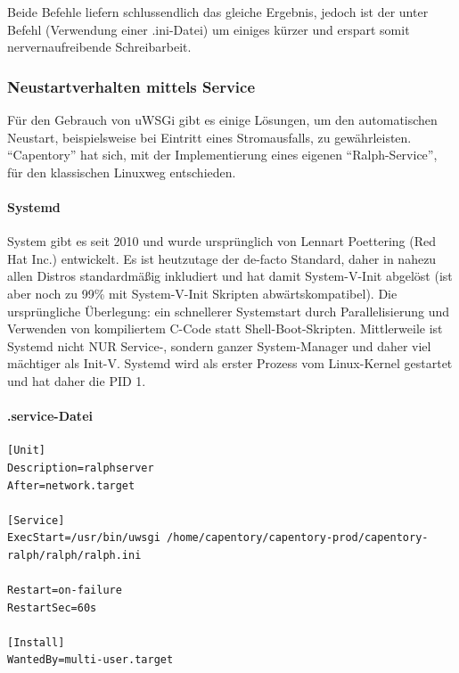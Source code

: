 Beide Befehle liefern schlussendlich das gleiche Ergebnis, jedoch ist
der unter Befehl (Verwendung einer .ini-Datei) um einiges kürzer und
erspart somit nervernaufreibende Schreibarbeit.

\hypertarget{neustartverhalten-mittels-service}{%
\subsubsection{Neustartverhalten mittels
Service}\label{neustartverhalten-mittels-service}}

Für den Gebrauch von uWSGi gibt es einige Lösungen, um den automatischen
Neustart, beispielsweise bei Eintritt eines Stromausfalls, zu
gewährleisten. ``Capentory'' hat sich, mit der Implementierung eines
eigenen ``Ralph-Service'', für den klassischen Linuxweg entschieden.

\hypertarget{systemd}{%
\paragraph{Systemd}\label{systemd}}

System gibt es seit 2010 und wurde ursprünglich von Lennart Poettering
(Red Hat Inc.) entwickelt. Es ist heutzutage der de-facto Standard,
daher in nahezu allen Distros standardmäßig inkludiert und hat damit
System-V-Init abgelöst (ist aber noch zu 99\% mit System-V-Init Skripten
abwärtskompatibel). Die ursprüngliche Überlegung: ein schnellerer
Systemstart durch Parallelisierung und Verwenden von kompiliertem C-Code
statt Shell-Boot-Skripten. Mittlerweile ist Systemd nicht NUR Service-,
sondern ganzer System-Manager und daher viel mächtiger als Init-V.
Systemd wird als erster Prozess vom Linux-Kernel gestartet und hat daher
die PID 1.

\hypertarget{service-datei}{%
\paragraph{.service-Datei}\label{service-datei}}

\begin{verbatim}
[Unit]
Description=ralphserver
After=network.target

[Service]
ExecStart=/usr/bin/uwsgi /home/capentory/capentory-prod/capentory-ralph/ralph/ralph.ini

Restart=on-failure
RestartSec=60s

[Install]
WantedBy=multi-user.target
\end{verbatim}

